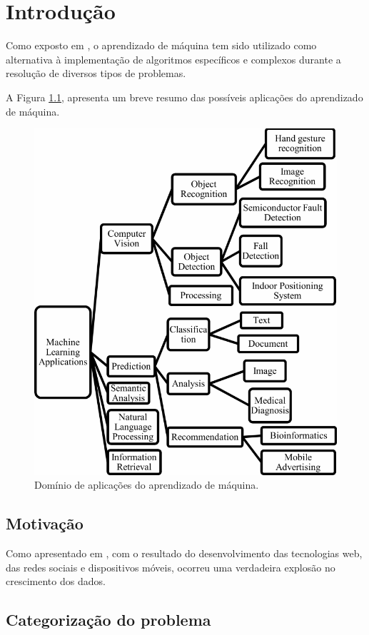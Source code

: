 \chapter{Introdução}

Como exposto em \cite{Torralba2008}, o aprendizado de máquina tem sido utilizado como alternativa à implementação de algoritmos específicos e complexos durante a resolução de diversos tipos de problemas. 

\lipsum[6]

A Figura \ref{fig:mlapplications}, apresenta um breve resumo das possíveis aplicações do aprendizado de máquina.

\begin{figure}[ht]
    \centering
    \includegraphics[width=0.7\linewidth]{figuras/mlapplications.png}
    \caption{Domínio de aplicações do aprendizado de máquina.}
    \label{fig:mlapplications}
\end{figure}

\lipsum[7-8]

\section{Motivação}

Como apresentado em \cite{MLBigdata}, com o resultado do desenvolvimento das tecnologias web, das redes sociais e dispositivos móveis, ocorreu uma verdadeira explosão no crescimento dos dados. 

\lipsum[9-16]


\section{Categorização do problema}

